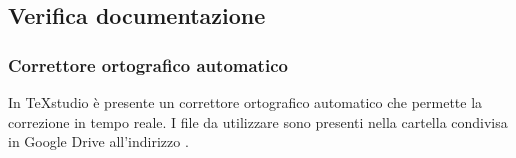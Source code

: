 	\subsection{Verifica documentazione}
			\subsubsection{Correttore ortografico automatico}
			In TeXstudio è presente un correttore ortografico automatico che permette la correzione in tempo reale. I file da utilizzare sono presenti nella cartella condivisa in Google Drive all'indirizzo .
